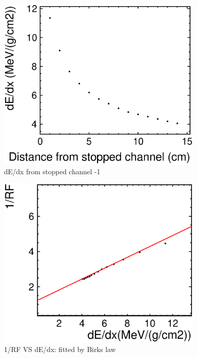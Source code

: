 \begin{figure}[!htb]
  \centering
  \centering
  \includegraphics[width=10cm,clip]{./fig/dEdx2.eps}
  \caption{dE/dx from stopped channel -1}
  \label{fadcDistdEdx}
\end{figure}

\begin{figure}[!htb]
  \centering
  \centering
  \includegraphics[width=10cm,clip]{./fig/RFresult2.eps}
  \caption{1/RF VS dE/dx: fitted by Birks law}
  \label{result}
\end{figure}

